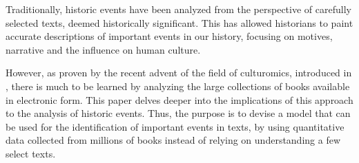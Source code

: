 
Traditionally, historic events have been analyzed from the perspective of carefully selected texts, deemed historically significant. This has allowed historians to paint accurate descriptions of important events in our history, focusing on motives, narrative and the influence on human culture.

However, as proven by the recent advent of the field of culturomics, introduced in , there is much to be learned by analyzing the large collections of books available in electronic form. This paper delves deeper into the implications of this approach to the analysis of historic events. Thus, the purpose is to devise a model that can be used for the identification of important events in texts, by using quantitative data collected from millions of books instead of relying on understanding a few select texts.
